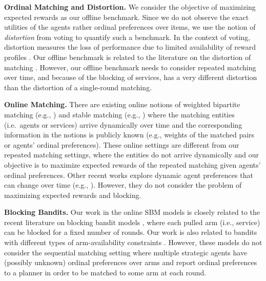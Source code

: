 \documentclass[letterpaper,11pt]{article}
\newcommand{\kibitz}[2]{\ifnum\Comments=1{\color{#1}{#2}}\fi}
\newcommand{\ltt}[1]{\kibitz{red}{[Long: #1]}}
\begin{document}
\textbf{Ordinal Matching and Distortion.}
We consider the objective of maximizing expected rewards as our offline benchmark. Since we do not observe the exact utilities of the agents rather ordinal preferences over items, we use the notion of \emph{distortion} \cite{PR06} from voting to quantify such a benchmark. In the context of voting, distortion measures the loss of performance due to limited availability of reward profiles \cite{BCHL+15, MPSW19, ABEP+18, Kempe20, AP17}. Our offline benchmark is related to the literature on the distortion of matching \cite{ABFV21, FFKZ14, AS16}. However, our offline benchmark needs to consider repeated matching over time, and because of the blocking of services, has a very different distortion than the distortion of a single-round matching.



\textbf{Online Matching.} 
There are existing online notions of weighted bipartite matching (e.g., \cite{Karp:1990un,Kalyanasundaram:1993wo,Karande:2011vz}) 
and stable matching (e.g., \cite{Khuller:1994vr})  
where the matching entities (i.e.\ agents or services) 
arrive dynamically over time and the corresponding information in the notions is publicly known 
(e.g., weights of the matched pairs or agents' ordinal preferences). 
These online settings are different from our repeated matching settings, where the entities 
do not arrive dynamically and our objective is to maximize expected rewards of the repeated matching 
given agents' ordinal preferences.  
Other recent works explore dynamic agent preferences that can change over time (e.g., \cite{Parkes:2013vs,Hosseini:2015tl,Hosseini:2015tc}). 
However, they do not consider the problem of maximizing expected rewards and blocking.  %

\textbf{Blocking Bandits.} Our work in the online SBM models is closely related to the recent literature on blocking bandit models \cite{Basu:2021ue,Basu:2019ui,Bishop:2020un}, where each pulled arm (i.e., service)
can be blocked for a fixed number of rounds. Our work is also related to bandits with different types of arm-availability constraints \cite{NV14, KI18, KNS10}. 
However, these models do not consider the sequential matching setting where multiple strategic agents have (possibly unknown) ordinal preferences over arms  
and report ordinal preferences to a planner in order to be matched to some arm at each round. 
\end{document}
